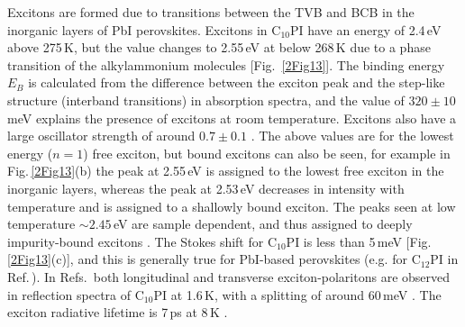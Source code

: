 Excitons are formed due to transitions between the TVB and BCB in the inorganic layers of PbI perovskites. Excitons in $\textrm{C}_{10}$PI have an energy of 2.4\,eV above 275\,K, but the value changes to 2.55\,eV at below 268\,K due to a phase transition of the alkylammonium molecules [Fig.\ \ref{2Fig13}]. The binding energy $E_B$ is calculated from the difference between the exciton peak and the step-like structure (interband transitions) in absorption spectra, and the value of $320\pm10$\,meV explains the presence of excitons at room temperature. Excitons also have a large oscillator strength of around $0.7\pm0.1$ \cite{Ishihara1990}. The above values are for the lowest energy ($n=1$) free exciton, but bound excitons can also be seen, for example in Fig.\,\ref{2Fig13}(b) the peak at 2.55\,eV is assigned to the lowest free exciton in the inorganic layers, whereas the peak at 2.53\,eV decreases in intensity with temperature and is assigned to a shallowly bound exciton. The peaks seen at low temperature $\sim2.45$\,eV are sample dependent, and thus assigned to deeply impurity-bound excitons \cite{Ishihara1990}. The Stokes shift for $\textrm{C}_{10}$PI is less than 5\,meV [Fig.\,\ref{2Fig13}(c)], and this is generally true for PbI-based perovskites (e.g. for $\textrm{C}_{12}$PI in Ref.\,\cite{Pradeesh2009}). In Refs.\,\cite{Ishihara1990, Ishihara1989} both longitudinal and transverse exciton-polaritons are observed in reflection spectra of $\textrm{C}_{10}$PI at 1.6\,K, with a splitting of around 60\,meV \cite{Ishihara1990}. The exciton radiative lifetime is 7\,ps at 8\,K \cite{Kondo1998a}.

